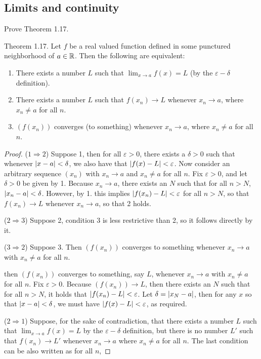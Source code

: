 \subsection{Limits and continuity}


\begin{exercise}{40}
Prove Theorem 1.17. 

Theorem 1.17. Let $f$ be a real valued function defined in some punctured neighborhood of $a\in\mathbb{R}$. Then the following are equivalent:
\begin{enumerate}
    \item There exists a number $L$ such that $\lim_{x\to a}f(x)=L$ (by the $\varepsilon-\delta$ definition).
    \item There exists a number $L$ such that $f(x_n)\to L$ whenever $x_n\to a$, where $x_n\neq a$ for all $n$.
    \item $(f(x_n))$ converges (to something) whenever $x_n\to a$, where $x_n\neq a$ for all $n$.
\end{enumerate}
\end{exercise}
\begin{proof}
($1\Rightarrow 2$) Suppose 1, then for all $\varepsilon>0$, there exists a $\delta>0$ such that whenever $\left\lvert x-a\right\rvert<\delta$, we also have that $\left\lvert f(x)-L\right\rvert<\varepsilon$. Now consider an arbitrary sequence $(x_n)$ with $x_n\to a$ and $x_n\neq a$ for all $n$. Fix $\varepsilon>0$, and let $\delta>0$ be given by 1. Because $x_n\to a$, there exists an $N$ such that for all $n>N$, $\left\lvert x_n-a\right\rvert<\delta$. However, by 1. this implies $\left\lvert f(x_n)-L\right\rvert<\varepsilon$ for all $n>N$, so that $f(x_n)\to L$ whenever $x_n\to a$, so that 2 holds.

($2\Rightarrow 3$) Suppose 2, condition 3 is less restrictive than 2, so it follows directly by it.

($3\Rightarrow 2$) Suppose 3. Then $(f(x_n))$ converges to something whenever $x_n\to a$ with $x_n\neq a$ for all $n$. 

then $(f(x_n))$ converges to something, say $L$, whenever $x_n\to a$ with $x_n\neq a$ for all $n$. Fix $\varepsilon>0$. Because $(f(x_n))\to L$, then there exists an $N$ such that for all $n>N$, it holds that $\left\lvert f(x_n)-L\right\rvert<\varepsilon$. Let $\delta = \left\lvert x_N-a\right\rvert$, then for any $x$ so that $\left\lvert x-a\right\rvert<\delta$, we must have $\left\lvert f(x)-L\right\rvert<\varepsilon$, as required.

($2\Rightarrow 1$) Suppose, for the sake of contradiction, that there exists a number $L$ such that $\lim_{x\to a}f(x)=L$ by the $\varepsilon-\delta$ definition, but there is no number $L'$ such that $f(x_n)\to L'$ whenever $x_n\to a$ where $x_n\neq a$ for all $n$. The last condition can be also written as for all $n$, 
\end{proof} 

